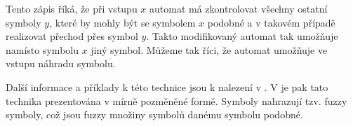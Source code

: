 \documentclass[a4paper,10pt]{article}
\begin{document}
Tento zápis říká, že při vstupu $x$ automat má zkontrolovat všechny ostatní symboly $y$, které by mohly být se symbolem $x$ podobné a v takovém případě realizovat přechod přes symbol $y$. Takto modifikovaný automat tak umožňuje namísto symbolu $x$  jiný symbol. Můžeme tak říci, že automat umožňuje ve vstupu náhradu symbolu.

Další informace a příklady k této technice jsou k nalezení v \cite{RamGir-ConvFinAutFuzzAutStrComp}. V \cite{Ech-DefSyssConPre} je pak tato technika prezentována v mírně pozměněné formě. Symboly nahrazují tzv. fuzzy symboly, což jsou fuzzy množiny symbolů danému symbolu podobné.

\end{document}
